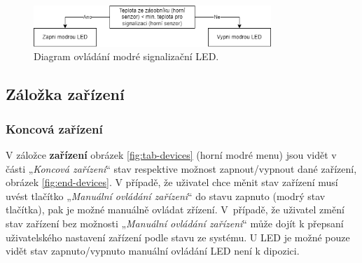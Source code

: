 \begin{Czech}
\begin{figure}[H]
    \centering
    \includegraphics[width=0.8\textwidth]{pictures/czech/software/diagram-blue-led-indication.png}
    \caption{Diagram ovládání modré signalizační LED.}
    \label{fig:diagram-blue-led-indication}
\end{figure}
\end{Czech}

\begin{Czech}
\end{Czech}


\begin{Czech}
\subsection{Záložka zařízení}
\end{Czech}

\begin{Czech}
\subsubsection{Koncová zařízení}
\end{Czech}

\begin{Czech}
V záložce \textbf{zařízení} obrázek \ref{fig:tab-devices} (horní modré menu) jsou vidět v části „\textit{Koncová zařízení}“ stav respektive možnost zapnout/vypnout dané zařízení, obrázek \ref{fig:end-devices}. V případě, že uživatel chce měnit stav zařízení musí uvést tlačítko „\textit{Manuální ovládání zařízení}“ do stavu zapnuto (modrý stav tlačítka), pak je možné manuálně ovládat zřízení. \mbox{V případě}, že uživatel změní stav zařízení bez možnosti „\textit{Manuální ovládání zařízení}“ může dojít k přepsaní uživatelského nastavení zařízení podle stavu ze systému. U LED je možné pouze vidět stav zapnuto/vypnuto manuální ovládání LED není k dipozici.
\end{Czech}

